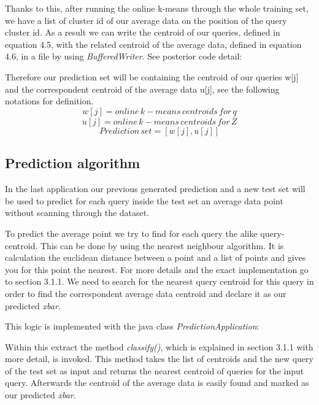 \documentclass{lmproj}
\begin{document}
Thanks to this, after running the online k-means through the whole training set, we have a list of cluster id of our average data on the position of the query cluster id. As a result we can write the centroid of our queries, defined in equation 4.5, with the related centroid of the average data, defined in equation 4.6, in a file by using \textit{BufferedWriter}. See posterior code detail:


Therefore our prediction set will be containing the centroid of our queries w[j] and the correspondent centroid of the average data u[j], see the following notations for definition.
\begin{equation}
w[j]= online\,k-means\,centroids\,for\,q
\end{equation}
\begin{equation}
u[j]= online\,k-means\,centroids\,for\,\bar{Z}
\end{equation}
\begin{equation}
Prediction\,set=[w[j],u[j]]
\end{equation}

\subsection{Prediction algorithm}

In the last application our previous generated prediction and a new test set will be used to predict for each query inside the test set an average data point without scanning through the dataset.

To predict the average point we try to find for each query the alike query-centroid. This can be done by using the nearest neighbour algorithm. It is calculation the euclidean distance between a point and a list of points and gives you for this point the nearest. For more details and the exact implementation go to section 3.1.1. We need to search for the nearest query centroid for this query in order to find the correspondent average data centroid and declare it as our predicted \textit{xbar}.  

This logic is implemented with the java class \textit{PredictionApplication}:


Within this extract the method \textit{classify()}, which is explained in section 3.1.1 with more detail, is invoked. This method takes the list of centroids and the new query of the test set as input and returns the nearest centroid of queries for the input query. Afterwards the centroid of the average data is easily found and marked as our predicted \textit{xbar}.
\end{document}
